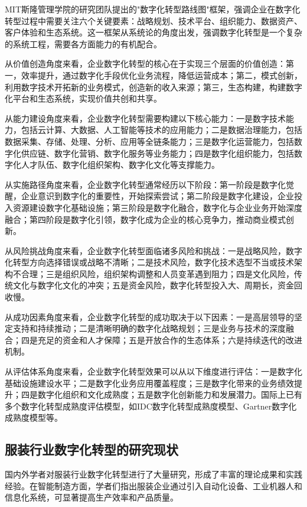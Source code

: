 \documentclass[12pt,a4paper]{article}
\begin{document}
MIT斯隆管理学院的研究团队提出的"数字化转型路线图"框架，强调企业在数字化转型过程中需要关注六个关键要素：战略规划、技术平台、组织能力、数据资产、客户体验和生态系统。这一框架从系统论的角度出发，强调数字化转型是一个复杂的系统工程，需要各方面能力的有机配合。

从价值创造角度来看，企业数字化转型的核心在于实现三个层面的价值创造：第一，效率提升，通过数字化手段优化业务流程，降低运营成本；第二，模式创新，利用数字技术开拓新的业务模式，创造新的收入来源；第三，生态构建，构建数字化平台和生态系统，实现价值共创和共享。

从能力建设角度来看，企业数字化转型需要构建以下核心能力：一是数字技术能力，包括云计算、大数据、人工智能等技术的应用能力；二是数据治理能力，包括数据采集、存储、处理、分析、应用等全链条能力；三是数字化运营能力，包括数字化供应链、数字化营销、数字化服务等业务能力；四是数字化组织能力，包括数字化人才队伍、数字化组织架构、数字化文化等支撑能力。

从实施路径角度来看，企业数字化转型通常经历以下阶段：第一阶段是数字化觉醒，企业意识到数字化的重要性，开始探索尝试；第二阶段是数字化建设，企业投入资源建设数字化基础设施；第三阶段是数字化融合，数字化与企业业务开始深度融合；第四阶段是数字化引领，数字化成为企业的核心竞争力，推动商业模式创新。

从风险挑战角度来看，企业数字化转型面临诸多风险和挑战：一是战略风险，数字化转型方向选择错误或战略不清晰；二是技术风险，数字化技术选型不当或技术架构不合理；三是组织风险，组织架构调整和人员变革遇到阻力；四是文化风险，传统文化与数字化文化的冲突；五是资金风险，数字化转型投入大、周期长，资金回收慢。

从成功因素角度来看，企业数字化转型的成功取决于以下因素：一是高层领导的坚定支持和持续推动；二是清晰明确的数字化战略规划；三是业务与技术的深度融合；四是充足的资金和人才保障；五是开放合作的生态体系；六是持续迭代的改进机制。

从评估体系角度来看，企业数字化转型效果可以从以下维度进行评估：一是数字化基础设施建设水平；二是数字化业务应用覆盖程度；三是数字化带来的业务绩效提升；四是数字化组织和文化成熟度；五是数字化创新能力和发展潜力。国际上已有多个数字化转型成熟度评估模型，如IDC数字化转型成熟度模型、Gartner数字化成熟度模型等。

\subsection{服装行业数字化转型的研究现状}

国内外学者对服装行业数字化转型进行了大量研究，形成了丰富的理论成果和实践经验。在智能制造方面，学者们指出服装企业通过引入自动化设备、工业机器人和信息化系统，可显著提高生产效率和产品质量。
\end{document}

